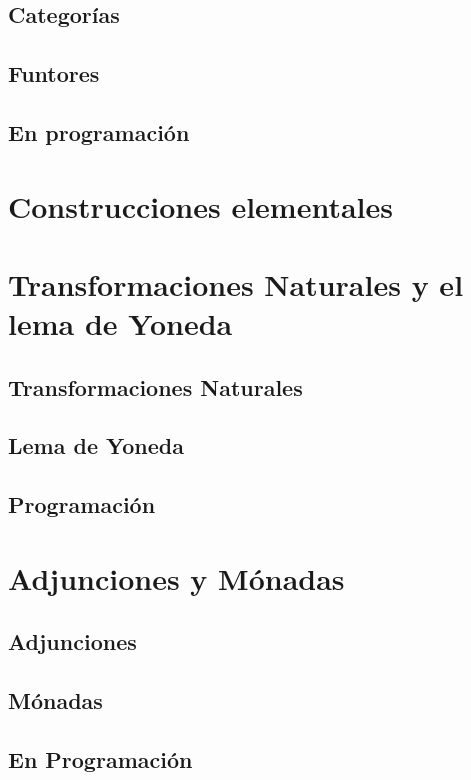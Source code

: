 \documentclass[12pt]{book}
\begin{document}
\section{Categorías}

\section{Funtores}

\section{En programación}

\chapter{Construcciones elementales}


\chapter{Transformaciones Naturales y el lema de Yoneda}
\section{Transformaciones Naturales}

\section{Lema de Yoneda}

\section{Programación}

\chapter{Adjunciones y Mónadas}
\section{Adjunciones}


\section{Mónadas}


\section{En Programación}

\end{document}
